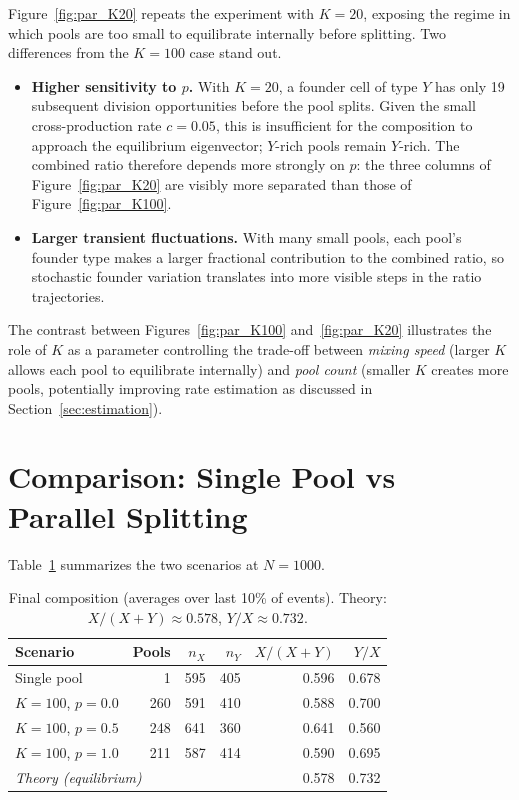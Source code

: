 \documentclass[12pt]{article}
\begin{document}
Figure~\ref{fig:par_K20} repeats the experiment with $K = 20$, exposing the
regime in which pools are too small to equilibrate internally before splitting.
Two differences from the $K = 100$ case stand out.

\begin{itemize}
  \item \textbf{Higher sensitivity to $p$.}  With $K = 20$, a founder cell
        of type $Y$ has only 19 subsequent division opportunities before the
        pool splits.  Given the small cross-production rate $c = 0.05$, this
        is insufficient for the composition to approach the equilibrium
        eigenvector; $Y$-rich pools remain $Y$-rich.  The combined ratio
        therefore depends more strongly on $p$: the three columns of
        Figure~\ref{fig:par_K20} are visibly more separated than those of
        Figure~\ref{fig:par_K100}.

  \item \textbf{Larger transient fluctuations.}  With many small pools,
        each pool's founder type makes a larger fractional contribution to
        the combined ratio, so stochastic founder variation translates into
        more visible steps in the ratio trajectories.
\end{itemize}

The contrast between Figures~\ref{fig:par_K100} and~\ref{fig:par_K20}
illustrates the role of $K$ as a parameter controlling the trade-off between
\emph{mixing speed} (larger $K$ allows each pool to equilibrate internally)
and \emph{pool count} (smaller $K$ creates more pools, potentially improving
rate estimation as discussed in Section~\ref{sec:estimation}).


\section{Comparison: Single Pool vs Parallel Splitting}
\label{sec:comparison}

Table~\ref{tab:summary} summarizes the two scenarios at $N = 1000$.

\begin{table}[H]
\centering
\caption{Final composition (averages over last 10\% of events).
         Theory: $X/(X+Y)\approx 0.578$, $Y/X\approx 0.732$.}
\label{tab:summary}
\begin{tabular}{lrrrrr}
\toprule
Scenario & Pools & $n_X$ & $n_Y$ & $X/(X+Y)$ & $Y/X$ \\
\midrule
Single pool              &   1  & 595 & 405 & 0.596 & 0.678 \\
\addlinespace
$K=100$, $p=0.0$  & 260  & 591 & 410 & 0.588 & 0.700 \\
$K=100$, $p=0.5$  & 248  & 641 & 360 & 0.641 & 0.560 \\
$K=100$, $p=1.0$  & 211  & 587 & 414 & 0.590 & 0.695 \\
\midrule
\multicolumn{4}{l}{\emph{Theory (equilibrium)}} & 0.578 & 0.732 \\
\bottomrule
\end{tabular}
\end{table}
\end{document}
